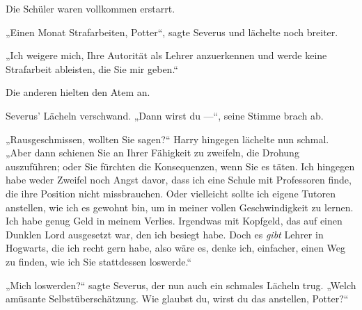 Die Schüler waren vollkommen erstarrt.

„Einen Monat Strafarbeiten, Potter“, sagte Severus und lächelte noch breiter.

„Ich weigere mich, Ihre Autorität als Lehrer anzuerkennen und werde keine Strafarbeit ableisten, die Sie mir geben.“

Die anderen hielten den Atem an.

Severus’ Lächeln verschwand.
„Dann wirst du —“, seine Stimme brach ab.

„Rausgeschmissen, wollten Sie sagen?“ Harry hingegen lächelte nun schmal.
„Aber dann schienen Sie an Ihrer Fähigkeit zu zweifeln, die Drohung auszuführen; oder Sie fürchten die Konsequenzen, wenn Sie es täten. Ich hingegen habe weder Zweifel noch Angst davor, dass ich eine Schule mit Professoren finde, die ihre Position nicht missbrauchen. Oder vielleicht sollte ich eigene Tutoren anstellen, wie ich es gewohnt bin, um in meiner vollen Geschwindigkeit zu lernen. Ich habe genug Geld in meinem Verlies. Irgendwas mit Kopfgeld, das auf einen Dunklen Lord ausgesetzt war, den ich besiegt habe. Doch es \emph{gibt} Lehrer in Hogwarts, die ich recht gern habe, also wäre es, denke ich, einfacher, einen Weg zu finden, wie ich Sie stattdessen loswerde.“

„Mich loswerden?“ sagte Severus, der nun auch ein schmales Lächeln trug.
„Welch amüsante Selbstüberschätzung. Wie glaubst du, wirst du das anstellen, Potter?“

